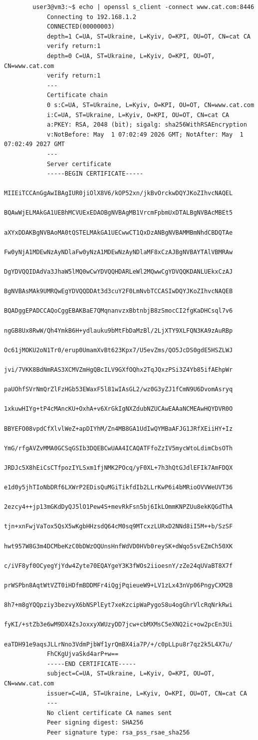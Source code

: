 \documentclass[14pt, a4paper]{extreport}
\begin{document}
	\begin{verbatim}
		user3@vm3:~$ echo | openssl s_client -connect www.cat.com:8446
			Connecting to 192.168.1.2
			CONNECTED(00000003)
			depth=1 C=UA, ST=Ukraine, L=Kyiv, O=KPI, OU=OT, CN=cat CA
			verify return:1
			depth=0 C=UA, ST=Ukraine, L=Kyiv, O=KPI, OU=OT, CN=www.cat.com
			verify return:1
			---
			Certificate chain
			0 s:C=UA, ST=Ukraine, L=Kyiv, O=KPI, OU=OT, CN=www.cat.com
			i:C=UA, ST=Ukraine, L=Kyiv, O=KPI, OU=OT, CN=cat CA
			a:PKEY: RSA, 2048 (bit); sigalg: sha256WithRSAEncryption
			v:NotBefore: May  1 07:02:49 2026 GMT; NotAfter: May  1 07:02:49 2027 GMT
			---
			Server certificate
			-----BEGIN CERTIFICATE-----
			MIIEiTCCAnGgAwIBAgIUR0jiOlX8V6/kOP52xn/jkBvOrckwDQYJKoZIhvcNAQEL
			BQAwWjELMAkGA1UEBhMCVUExEDAOBgNVBAgMB1VrcmFpbmUxDTALBgNVBAcMBEt5
			aXYxDDAKBgNVBAoMA0tQSTELMAkGA1UECwwCT1QxDzANBgNVBAMMBmNhdCBDQTAe
			Fw0yNjA1MDEwNzAyNDlaFw0yNzA1MDEwNzAyNDlaMF8xCzAJBgNVBAYTAlVBMRAw
			DgYDVQQIDAdVa3JhaW5lMQ0wCwYDVQQHDARLeWl2MQwwCgYDVQQKDANLUEkxCzAJ
			BgNVBAsMAk9UMRQwEgYDVQQDDAt3d3cuY2F0LmNvbTCCASIwDQYJKoZIhvcNAQEB
			BQADggEPADCCAQoCggEBAKBaE7QMqnanvzxBbtnbjB8zSmocCI2fgKaDHCsql7v6
			ngGB8Ux8RwW/Qh4YmkB6H+ydlauku9bMtFbDaMzBl/2LjXTY9XLFQN3KA9zAuRBp
			Oc61jMOKU2oN1Tr0/erup0UmamXvBt623Kpx7/U5evZms/QO5JcDS0gdE5HSZLWJ
			jvi/7VKK8BdNmRAS3XCMVZmHgQBcILV9GXfOQhx2TqJQxzPSi3Z4Yb85ifAEhpWr
			paUOhfSVrNmQrZlFzHGb53EWaxF5l81wIAsGL2/wz0G3yZJ1fCmN9U6DvomAsryq
			1xkuwHIYg+tP4cMAncKU+OxhA+v6XrGkIgNXZdubNZUCAwEAAaNCMEAwHQYDVR0O
			BBYEFO08vpdCfXlvlWeZ+apDIYhM/Zn4MB8GA1UdIwQYMBaAFJG1JRfXEiiHY+Iz
			YmG/rfgAVZvMMA0GCSqGSIb3DQEBCwUAA4ICAQATFfoZzIV5mycWtoLdimCbsOTh
			JRDJc5X8hEiCsCTfpozIYLSxm1fjNMK2POcq/yF0XL+7h3hQtGJdlEFIk7AmFDQX
			e1d0y5jhTIoNbDRf6LXWrP2EDisQuMGiTikfdIb2LLrKwP6i4bMRioOVVWeUVT36
			2ezcy4++jp13mGKdDyQJ5lO1Pew4S+mevRkFsn5bj6IkLOmmKNPZUu8ekKQGdThA
			tjn+xnFwjVaTox5QsX5wKgbHHzsdQ64cM0sq9MTcxzLURxD2NNd8iI5M++b/SzSF
			hwt957W8G3m4DCMbeKzC0bDWzOQUnsHnfWdVD0HVb0reySK+dWqo5svEZmCh50XK
			c/iVF8yf0OCyegYjYdw4Zyte70EQAYgeY3K3fWOs2iioesnY/zZe24qUVaBT8X7f
			prWSPbn8AqtWtVZT0iHDfmBDDMFr4iQgjPqieueW9+LV1zLx43nVp06PngyCXM2B
			8h7+m8gYQQpziy3bezvyX6bNSPlEyt7xeKzcipWaPygoS8u4ogGhrVlcRqNrkRwi
			fyKI/+stZb3e6wM9DX4ZsJoxxyXWUzyDD7jcw+cbMXMsC5eXNQ2ic+ow2pcEn3Ui
			eaTDH91e9aqsJLLrNno3VdmPjbWf1yrQmBX4ia7P/+/c0pLLpu8r7qz2k5L4X7u/
			FhCKgUjvaSkd4arP+w==
			-----END CERTIFICATE-----
			subject=C=UA, ST=Ukraine, L=Kyiv, O=KPI, OU=OT, CN=www.cat.com
			issuer=C=UA, ST=Ukraine, L=Kyiv, O=KPI, OU=OT, CN=cat CA
			---
			No client certificate CA names sent
			Peer signing digest: SHA256
			Peer signature type: rsa_pss_rsae_sha256

\end{verbatim}
\end{document}
